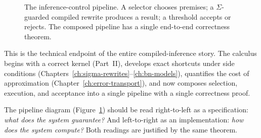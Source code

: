 \documentclass[11pt,openany]{report}
\begin{document}
\begin{figure}[htbp]
\caption{The inference-control pipeline.  A selector chooses premises;
a $\Sigma$-guarded compiled rewrite produces a result; a threshold
accepts or rejects.  The composed pipeline has a single end-to-end
correctness theorem.}
\label{fig:inference-control-pipeline}
\end{figure}

\noindent
This is the technical endpoint of the entire compiled-inference story.
The calculus begins with a correct kernel (Part~II), develops exact
shortcuts under side conditions (Chapters~\ref{ch:sigma-rewrites}--\ref{ch:bn-models}), quantifies the cost of approximation
(Chapter~\ref{ch:error-transport}), and now composes
selection, execution, and acceptance into a single
pipeline with a single correctness proof.

The pipeline diagram (Figure~\ref{fig:inference-control-pipeline})
should be read right-to-left as a specification:
\emph{what does the system guarantee?}  And left-to-right as an
implementation: \emph{how does the system compute?}  Both readings
are justified by the same theorem.
\end{document}
